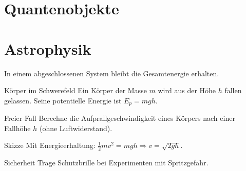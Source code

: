 \documentclass[11pt,a4paper,oneside]{article}
\begin{document}
	
	\section{Quantenobjekte}
	\section{Astrophysik}
	
	
	\newpage
	
	
	
	
	
	
	\newpage
	
	
	
	
	
	
	
	\begin{theo}
		In einem abgeschlossenen System bleibt die Gesamtenergie erhalten.
	\end{theo}
	
	\begin{exem}{Körper im Schwerefeld}
		Ein Körper der Masse $m$ wird aus der Höhe $h$ fallen gelassen. Seine potentielle Energie ist $E_p = mgh$.
	\end{exem}
	
	\begin{aufgabe}{Freier Fall}
		Berechne die Aufprallgeschwindigkeit eines Körpers nach einer Fallhöhe $h$ (ohne Luftwiderstand).
	\end{aufgabe}
	
	\begin{loesung}{Skizze}
		Mit Energieerhaltung: $\frac12 mv^2 = mgh \Rightarrow v=\sqrt{2gh}$.
	\end{loesung}
	
	\begin{infobox}{Sicherheit}
		Trage Schutzbrille bei Experimenten mit Spritzgefahr.
	\end{infobox}
	
\end{document}
